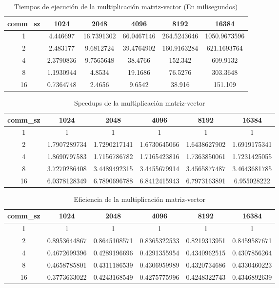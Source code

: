 \documentclass[a4paper,12pt]{article}
\begin{document}
\begin{table}
\begin{center}
\begin{tabular}{|c|c|c|c|c|c|}\hline
comm\_sz & 1024 & 2048 & 4096 & 8192 & 16384\\\hline
1 & 4.446697 & 16.7391302 & 66.0467146 & 264.5243646 & 1050.9673596\\\hline
2 & 2.483177 & 9.6812724 & 39.4764902 & 160.9163284 & 621.1693764\\\hline
4 & 2.3790836 & 9.7565648 & 38.4766 & 152.342 & 609.9132\\\hline
8 & 1.1930944 & 4.8534 & 19.1686 & 76.5276 & 303.3648\\\hline
16 & 0.7364748 & 2.4656 & 9.6542 & 38.916 & 151.109\\\hline
\end{tabular}
\end{center}
\caption{Tiempos de ejecución de la multiplicación matriz-vector (En milisegundos)}
\label{tab:1}
\end{table}

\begin{table}
\begin{center}
\begin{tabular}{|c|c|c|c|c|c|}\hline
comm\_sz & 1024 & 2048 & 4096 & 8192 & 16384\\\hline
1 & 1 & 1 & 1 & 1 & 1\\\hline
2 & 1.7907289734 & 1.7290217141 & 1.6730645066 & 1.6438627902 & 1.6919175341\\\hline
4 & 1.8690797583 & 1.7156786782 & 1.7165423816 & 1.7363850061 & 1.7231425055\\\hline
8 & 3.7270286408 & 3.4489492315 & 3.4455679914 & 3.4565877487 & 3.4643681785\\\hline
16 & 6.0378128349 & 6.7890696788 & 6.8412415943 & 6.7973163891 & 6.955028222\\\hline
\end{tabular}
\end{center}
\caption{Speedups de la multiplicación matriz-vector}
\label{tab:2}
\end{table}

\begin{table}
\begin{center}
\begin{tabular}{|c|c|c|c|c|c|}\hline
comm\_sz & 1024 & 2048 & 4096 & 8192 & 16384\\\hline
1 & 1 & 1 & 1 & 1 & 1\\\hline
2 & 0.8953644867 & 0.8645108571 & 0.8365322533 & 0.8219313951 & 0.8459587671\\\hline
4 & 0.4672699396 & 0.4289196696 & 0.4291355954 & 0.4340962515 & 0.4307856264\\\hline
8 & 0.4658785801 & 0.4311186539 & 0.4306959989 & 0.4320734686 & 0.4330460223\\\hline
16 & 0.3773633022 & 0.4243168549 & 0.4275775996 & 0.4248322743 & 0.4346892639\\\hline
\end{tabular}
\end{center}
\caption{Eficiencia de la multiplicación matriz-vector}
\label{tab:3}
\end{table}
\end{document}
